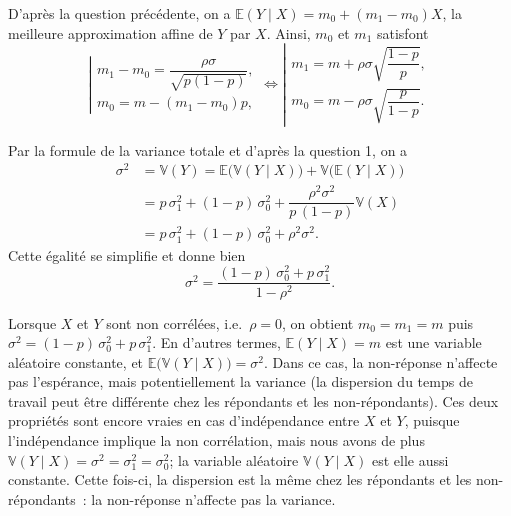 \label{III-answer-nonrep2}
D'après la question précédente, on a
\(\mathbb{E}(Y\mid X) = m_0 + (m_1 - m_0) X\), la meilleure
approximation affine de \(Y\) par \(X\). Ainsi, \(m_0\) et \(m_1\)
satisfont
\[\left|\begin{array}{l} m_1 - m_0 = \dfrac{\rho\sigma}{\sqrt{p(1-p)}},\\[1em] m_0 = m - (m_1-m_0)p,  \end{array}\right. \Leftrightarrow \left|\begin{array}{l} m_1 = m + \rho\sigma\sqrt{\dfrac{1-p}{p}},\\[1em] m_0 = m - \rho\sigma\sqrt{\dfrac{p}{1-p}}.  \end{array}\right.\]

\label{III-answer-nonrep3}
Par la formule de la variance totale et d'après la question 1, on a
\begin{align*}
\sigma^2 &= \mathbb{V}\left(Y\right) = \mathbb{E}\bigl(\mathbb{V}\left(Y\mid X\right)\bigr) + \mathbb{V}\bigl(\mathbb{E}(Y\mid X)\bigr)\\
&= p\,\sigma^2_1 + (1-p)\,\sigma^2_0 + \dfrac{\rho^2\sigma^2}{p\,(1-p)}\mathbb{V}(X)\\
&= p\,\sigma^2_1 + (1-p)\,\sigma^2_0 + \rho^2\sigma^2.
\end{align*} Cette égalité se simplifie et donne bien
\[\sigma^2 = \dfrac{(1-p)\,\sigma_0^2 + p\,\sigma_1^2}{1-\rho^2}.\]

\label{III-answer-nonrep4}
Lorsque \(X\) et \(Y\) sont non corrélées, i.e.~\(\rho = 0\), on obtient
\(m_0 = m_1 = m\) puis \(\sigma^2 = (1-p)\,\sigma_0^2 + p\,\sigma_1^2\).
En d'autres termes, \(\mathbb{E}(Y\mid X) = m\) est une variable
aléatoire constante, et
\(\mathbb{E}\bigl(\mathbb{V}(Y\mid X)\bigr) = \sigma^2\). Dans ce cas,
la non-réponse n'affecte pas l'espérance, mais potentiellement la
variance (la dispersion du temps de travail peut être différente chez
les répondants et les non-répondants). Ces deux propriétés sont encore
vraies en cas d'indépendance entre \(X\) et \(Y\), puisque
l'indépendance implique la non corrélation, mais nous avons de plus
\(\mathbb{V}(Y\mid X) = \sigma^2 = \sigma^2_1 = \sigma^2_0\); la
variable aléatoire \(\mathbb{V}(Y\mid X)\) est elle aussi constante.
Cette fois-ci, la dispersion est la même chez les répondants et les
non-répondants~: la non-réponse n'affecte pas la variance.

